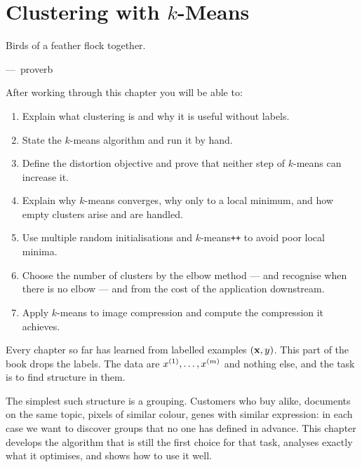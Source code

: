 
\chapter{Clustering with \texorpdfstring{$k$}{k}-Means}
\label{ch:ch13}

\epigraph{Birds of a feather flock together.}{---\ proverb}

\begin{chapterlearning}
After working through this chapter you will be able to:
\begin{enumerate}
  \item Explain what clustering is and why it is useful without labels.
  \item State the $k$-means algorithm and run it by hand.
  \item Define the distortion objective and prove that neither step of $k$-means
        can increase it.
  \item Explain why $k$-means converges, why only to a local minimum, and how
        empty clusters arise and are handled.
  \item Use multiple random initialisations and $k$-means\texttt{++} to avoid
        poor local minima.
  \item Choose the number of clusters by the elbow method --- and recognise when
        there is no elbow --- and from the cost of the application downstream.
  \item Apply $k$-means to image compression and compute the compression it
        achieves.
\end{enumerate}
\end{chapterlearning}

Every chapter so far has learned from labelled examples $(\mathbf{x}, y)$. This part of
the book drops the labels. The data are $x^{(1)},\dots,x^{(m)}$ and nothing else,
and the task is to find structure in them.

The simplest such structure is a grouping. Customers who buy alike, documents on
the same topic, pixels of similar colour, genes with similar expression: in each
case we want to discover groups that no one has defined in advance. This chapter
develops the algorithm that is still the first choice for that task, analyses
exactly what it optimises, and shows how to use it well.

